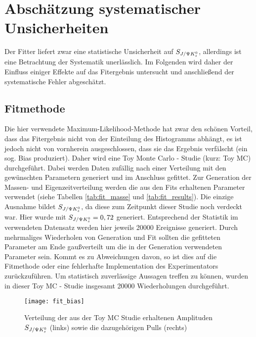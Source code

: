 \chapter{Abschätzung systematischer Unsicherheiten} \label{kap:systematik}
Der Fitter liefert zwar eine statistische Unsicherheit auf $S_{J/\Psi K_s^0}$, allerdings ist eine Betrachtung der Systematik unerlässlich. Im Folgenden wird daher der Einfluss einiger Effekte auf das Fitergebnis untersucht und anschließend der systematische Fehler abgeschätzt.

\section{Fitmethode} \label{kap:fit_bias}
Die hier verwendete Maximum-Likelihood-Methode hat zwar den schönen Vorteil, dass das Fitergebnis nicht von der Einteilung des Histogramms abhängt, es ist jedoch nicht von vornherein ausgeschlossen, dass sie das Ergebnis verfälscht (ein sog. Bias produziert). Daher wird eine Toy Monte Carlo - Studie (kurz: Toy MC) durchgeführt. Dabei werden Daten zufällig nach einer Verteilung mit den gewünschten Parametern generiert und im Anschluss gefittet. Zur Generation der Massen- und Eigenzeitverteilung werden die aus den Fits erhaltenen Parameter verwendet (siehe Tabellen \ref{tab:fit_masse} und \ref{tab:fit_results}). Die einzige Ausnahme bildet $S_{J/\Psi K_s^0}$, da diese zum Zeitpunkt dieser Studie noch verdeckt war. Hier wurde mit $S_{J/\Psi K_s^0} = 0,72$ generiert. Entsprechend der Statistik im verwendeten Datensatz werden hier jeweils 20000 Ereignisse generiert. Durch mehrmaliges Wiederholen von Generation und Fit sollten die gefitteten Parameter am Ende gaußverteilt um die in der Generation verwendeten Parameter sein. Kommt es zu Abweichungen davon, so ist dies auf die Fitmethode oder eine fehlerhafte Implementation des Experimentators zurückzuführen. Um statistisch zuverlässige Aussagen treffen zu können, wurden in dieser Toy MC - Studie insgesamt 20000 Wiederholungen durchgeführt.

\begin{figure}[hptb]
\centering
\texttt{[image: fit\_bias]}
\caption{Verteilung der aus der Toy MC Studie erhaltenen Amplituden $S_{J/\Psi K_s^0}$ (links) sowie die dazugehörigen Pulls (rechts)}
\label{fig:fit_bias}
\end{figure}

